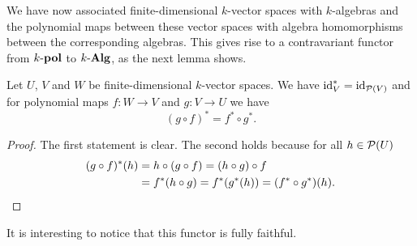 We have now associated finite-dimensional $k$-vector spaces with $k$-algebras and the polynomial maps between these vector spaces with algebra homomorphisms between the corresponding algebras. This gives rise to a contravariant functor from $k\text{-}\mathbf{pol}$ to $k\text{-}\mathbf{Alg}$, as the next lemma shows.


\begin{prop}
 Let $U$, $V$ and $W$ be finite-dimensional $k$-vector spaces. We have $\operatorname{id}_V^* = \operatorname{id}_{\mathcal{P}(V)}$ and for polynomial maps $f \colon W \to V$ and $g \colon V \to U$ we have
 \[
  (g \circ f)^* = f^* \circ g^*.
 \]
\end{prop}
\begin{proof}
 The first statement is clear. The second holds because for all $h \in \mathcal{P}(U)$
 \begin{align*}
  (g \circ f)^*(h)
  &= h \circ (g \circ f) = (h \circ g) \circ f \\
  &= f^* (h \circ g) = f^*(g^*(h)) = (f^* \circ g^*)(h).
  \qedhere
 \end{align*}
\end{proof}


It is interesting to notice that this functor is fully faithful.


